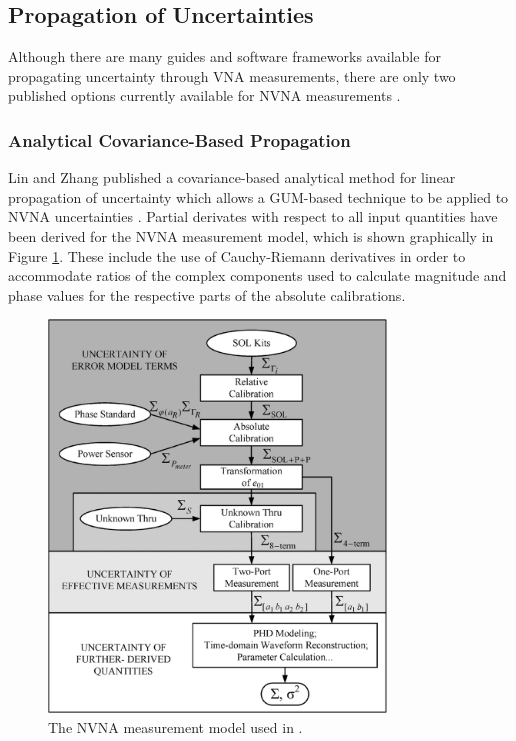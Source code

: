 \documentclass[../thesis/thesis.tex]{subfiles}
\begin{document}
\subsection{Propagation of Uncertainties}

Although there are many guides and software frameworks available for propagating uncertainty through VNA measurements, there are only two published options currently available for NVNA measurements \cite{Lin_2012, MUFWebsite}.

\subsubsection{Analytical Covariance-Based Propagation}

Lin and Zhang published a covariance-based analytical method for linear propagation of uncertainty which allows a GUM-based technique to be applied to NVNA uncertainties \cite{Lin_2012}. Partial derivates with respect to all input quantities have been derived for the NVNA measurement model, which is shown graphically in Figure \ref{ch4_fig_linmodel}. These include the use of Cauchy-Riemann derivatives in order to accommodate ratios of the complex components used to calculate magnitude and phase values for the respective parts of the absolute calibrations.

\begin{figure}
	\centering
	\includegraphics[width=0.8\textwidth]{linmodel.png}
	\caption{The NVNA measurement model used in \cite{Lin_2012}.}
	\label{ch4_fig_linmodel}
\end{figure}
\end{document}
